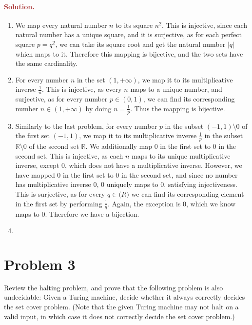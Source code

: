 \paragraph{\textcolor{brown}{Solution.}}
\begin{enumerate}
    \item We map every natural number $n$ to its square $n^2$. This is injective, since each natural number has a unique square, and it is surjective, as for each perfect square $p = q^2$, we can take its square root and get the natural number $|q|$ which maps to it. Therefore this mapping is bijective, and the two sets have the same cardinality.
    \item For every number $n$ in the set $(1, +\infty)$, we map it to its multiplicative inverse $\frac{1}{n}$. This is injective, as every $n$ maps to a unique number, and surjective, as for every number $p \in (0, 1)$, we can find its corresponding number $n \in (1, +\infty)$ by doing $n=\frac{1}{p}$. Thus the mapping is bijective.
    \item Similarly to the last problem, for every number $p$ in the subset $(-1, 1) \setminus 0$ of the first set $(-1, 1)$, we map it to its multiplicative inverse $\frac{1}{p}$ in the subset $\mathbb{R} \setminus 0$ of the second set $\mathbb{R}$. We additionally map $0$ in the first set to $0$ in the second set. This is injective, as each $n$ maps to its unique multiplicative inverse, except 0, which does not have a multiplicative inverse. However, we have mapped 0 in the first set to 0 in the second set, and since no number has multiplicative inverse 0, 0 uniquely maps to 0, satisfying injectiveness. This is surjective, as for every $q \in \mathbb(R)$ we can find its corresponding element in the first set by performing $\frac{1}{q}$. Again, the exception is 0, which we know maps to 0. Therefore we have a bijection.
    \item 
\end{enumerate}



\section*{Problem 3}
Review the halting problem, and prove that the following problem is also undecidable: Given a Turing machine, decide whether it always correctly decides the set cover problem. (Note that the given Turing machine may not halt on a valid input, in which case it does not correctly decide the set cover problem.)

